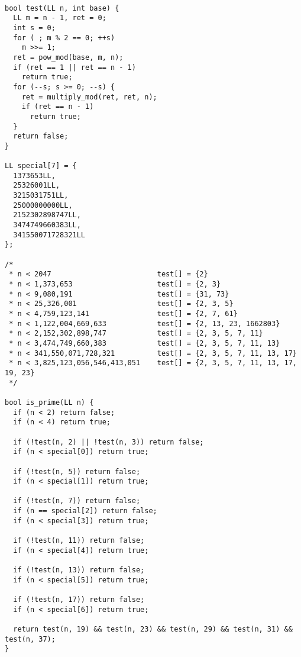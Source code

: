 \begin{lstlisting}

bool test(LL n, int base) {
  LL m = n - 1, ret = 0;
  int s = 0;
  for ( ; m % 2 == 0; ++s)
    m >>= 1;
  ret = pow_mod(base, m, n);
  if (ret == 1 || ret == n - 1)
    return true;
  for (--s; s >= 0; --s) {
    ret = multiply_mod(ret, ret, n);
    if (ret == n - 1)
      return true;
  }
  return false;
}

LL special[7] = {
  1373653LL, 
  25326001LL, 
  3215031751LL, 
  25000000000LL,
  2152302898747LL, 
  3474749660383LL, 
  341550071728321LL
};

/*
 * n < 2047                         test[] = {2}
 * n < 1,373,653                    test[] = {2, 3}
 * n < 9,080,191                    test[] = {31, 73}
 * n < 25,326,001                   test[] = {2, 3, 5}
 * n < 4,759,123,141                test[] = {2, 7, 61}
 * n < 1,122,004,669,633            test[] = {2, 13, 23, 1662803}
 * n < 2,152,302,898,747            test[] = {2, 3, 5, 7, 11}
 * n < 3,474,749,660,383            test[] = {2, 3, 5, 7, 11, 13}
 * n < 341,550,071,728,321          test[] = {2, 3, 5, 7, 11, 13, 17}
 * n < 3,825,123,056,546,413,051    test[] = {2, 3, 5, 7, 11, 13, 17, 19, 23}
 */

bool is_prime(LL n) {
  if (n < 2) return false;
  if (n < 4) return true;

  if (!test(n, 2) || !test(n, 3)) return false;
  if (n < special[0]) return true;

  if (!test(n, 5)) return false;
  if (n < special[1]) return true;

  if (!test(n, 7)) return false;
  if (n == special[2]) return false;
  if (n < special[3]) return true;

  if (!test(n, 11)) return false;
  if (n < special[4]) return true;

  if (!test(n, 13)) return false;
  if (n < special[5]) return true;

  if (!test(n, 17)) return false;
  if (n < special[6]) return true;

  return test(n, 19) && test(n, 23) && test(n, 29) && test(n, 31) && test(n, 37);
}

\end{lstlisting}